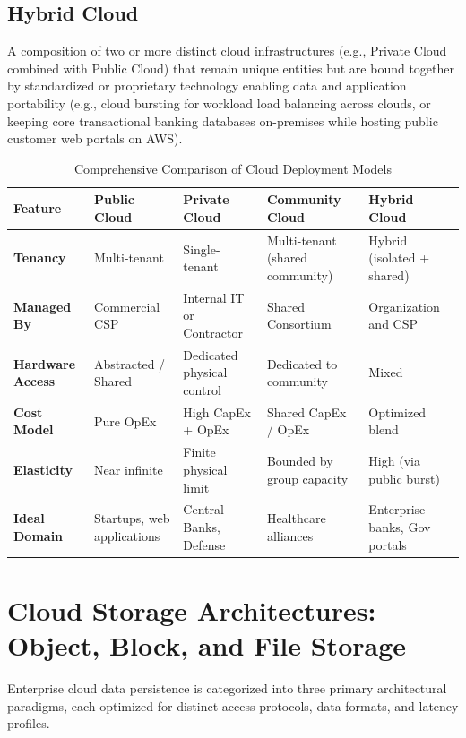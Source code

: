 \subsection{Hybrid Cloud}
A composition of two or more distinct cloud infrastructures (e.g., Private Cloud combined with Public Cloud) that remain unique entities but are bound together by standardized or proprietary technology enabling data and application portability (e.g., cloud bursting for workload load balancing across clouds, or keeping core transactional banking databases on-premises while hosting public customer web portals on AWS).

\begin{table}[htbp]
\centering
\small
\caption{Comprehensive Comparison of Cloud Deployment Models}
\label{tab:deployment_models}
\begin{tabularx}{\textwidth}{lXXXX}
\toprule
\textbf{Feature} & \textbf{Public Cloud} & \textbf{Private Cloud} & \textbf{Community Cloud} & \textbf{Hybrid Cloud} \\
\midrule
\textbf{Tenancy} & Multi-tenant & Single-tenant & Multi-tenant (shared community) & Hybrid (isolated + shared) \\
\textbf{Managed By} & Commercial CSP & Internal IT or Contractor & Shared Consortium & Organization and CSP \\
\textbf{Hardware Access} & Abstracted / Shared & Dedicated physical control & Dedicated to community & Mixed \\
\textbf{Cost Model} & Pure OpEx & High CapEx + OpEx & Shared CapEx / OpEx & Optimized blend \\
\textbf{Elasticity} & Near infinite & Finite physical limit & Bounded by group capacity & High (via public burst) \\
\textbf{Ideal Domain} & Startups, web applications & Central Banks, Defense & Healthcare alliances & Enterprise banks, Gov portals \\
\bottomrule
\end{tabularx}
\end{table}


\section{Cloud Storage Architectures: Object, Block, and File Storage}
\label{sec:cloud_storage}

Enterprise cloud data persistence is categorized into three primary architectural paradigms, each optimized for distinct access protocols, data formats, and latency profiles.

